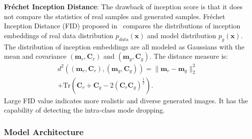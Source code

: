 \documentclass{article}
\begin{document}
\textbf{Fr\'{e}chet Inception Distance}: The drawback of inception score is that it does not
compare the statistics of real samples and generated samples.
Fr\'{e}chet Inception Distance (FID) proposed in~\cite{heusel2017gans} compares the distributions of inception embeddings of real data distribution $p_{data}\left(\mathbf{x}\right)$ and model distribution $p_g\left(\mathbf{x}\right)$.
The distribution of inception embeddings are all modeled as Gaussians with the mean and covariance $\left(\mathbf{m}_r, \mathbf{C}_r\right)$ and $\left(\mathbf{m}_g,\mathbf{C}_g\right)$.
The distance measure is:
\begin{multline}
d^2\left(\left(\mathbf{m}_r, \mathbf{C}_r\right),\left(\mathbf{m}_g, \mathbf{C}_g\right)\right)
=
\|\mathbf{m}_r-\mathbf{m}_g\|_2^2  \\
+
\text{Tr}\left(\mathbf{C}_r + \mathbf{C}_g - 2\left(\mathbf{C}_r\mathbf{C}_g\right)^{\frac{1}{2}}\right).
\end{multline}
Large FID value indicates more realistic and diverse generated images.
It has the capability of detecting the intra-class mode dropping.

\subsubsection{Model Architecture}
\label{sec:Architec}
\end{document}
